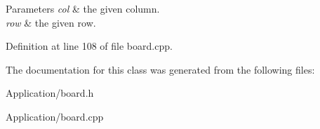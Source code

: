 \begin{DoxyParams}{Parameters}
{\em col} & the given column. \\
\hline
{\em row} & the given row. \\
\hline
\end{DoxyParams}


Definition at line 108 of file board.\+cpp.



The documentation for this class was generated from the following files\+:\begin{DoxyCompactItemize}
\item 
Application/board.\+h\item 
Application/board.\+cpp\end{DoxyCompactItemize}

